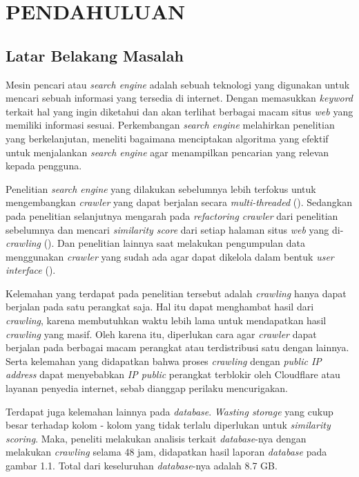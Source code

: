 
\chapter{PENDAHULUAN}

\section{Latar Belakang Masalah}

Mesin pencari atau \emph{search engine} adalah sebuah teknologi yang digunakan untuk mencari sebuah informasi yang tersedia di internet. Dengan memasukkan \emph{keyword} terkait hal yang ingin diketahui dan akan terlihat berbagai macam situs \emph{web} yang memiliki informasi sesuai. Perkembangan \emph{search engine} melahirkan penelitian yang berkelanjutan, meneliti bagaimana menciptakan algoritma yang efektif untuk menjalankan \emph{search engine} agar menampilkan pencarian yang relevan kepada pengguna.  

Penelitian \emph{search engine} yang dilakukan sebelumnya lebih terfokus untuk mengembangkan \emph{crawler} yang dapat berjalan secara \emph{multi-threaded} (\cite{fathan2021search}). Sedangkan pada penelitian selanjutnya mengarah pada \emph{refactoring crawler} dari penelitian sebelumnya dan mencari \emph{similarity score} dari setiap halaman situs \emph{web} yang di-\emph{crawling} (\cite{lazuardy2023search}). Dan penelitian lainnya saat melakukan pengumpulan data menggunakan \emph{crawler} yang sudah ada agar dapat dikelola dalam bentuk \emph{user interface} (\cite{aldian2024search}).

Kelemahan yang terdapat pada penelitian tersebut adalah \emph{crawling} hanya dapat berjalan pada satu perangkat saja. Hal itu dapat menghambat hasil dari \emph{crawling}, karena membutuhkan waktu lebih lama untuk mendapatkan hasil \emph{crawling} yang masif. Oleh karena itu, diperlukan cara agar \emph{crawler} dapat berjalan pada berbagai macam perangkat atau terdistribusi satu dengan lainnya. Serta kelemahan yang didapatkan bahwa proses \emph{crawling} dengan \emph{public IP address} dapat menyebabkan \emph{IP public} perangkat terblokir oleh Cloudflare atau layanan penyedia internet, sebab dianggap perilaku mencurigakan.

Terdapat juga kelemahan lainnya pada \emph{database}. \emph{Wasting storage} yang cukup besar terhadap kolom - kolom yang tidak terlalu diperlukan untuk \emph{similarity scoring}. Maka, peneliti melakukan analisis terkait \emph{database}-nya dengan melakukan \emph{crawling} selama 48 jam, didapatkan hasil laporan \emph{database} pada gambar 1.1. Total dari keseluruhan \emph{database}-nya adalah 8.7 GB.

